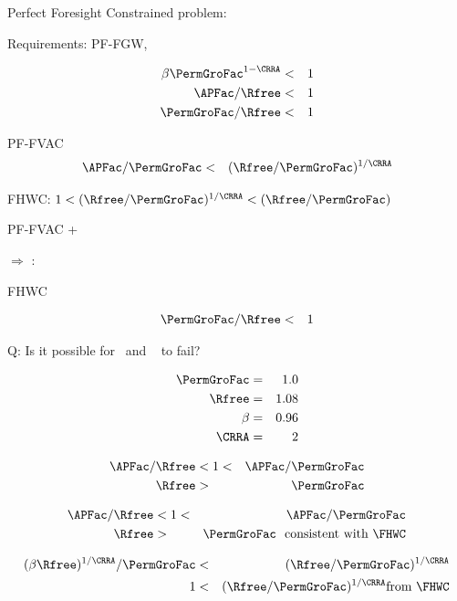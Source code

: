 \documentclass[titlepage,abstract]{bejournal}
\begin{document}
Perfect Foresight Constrained problem:

Requirements: PF-FGW, \FHWC~





\begin{eqnarray}
    \beta \PermGroFac^{1-\CRRA} & < & 1   \label{eq:PFFVAC}
\\  \APFac/\Rfree & < & 1 \label{eq:RIC}
\\  \PermGroFac/\Rfree & < & 1  \label{eq:FHWC}
\end{eqnarray}

PF-FVAC
\begin{eqnarray}
  \APFac/\PermGroFac & < & (\Rfree/\PermGroFac)^{1/\CRRA} \label{eq:RIC}
\end{eqnarray}

FHWC: $1 < (\Rfree/\PermGroFac)^{1/\CRRA} < (\Rfree/\PermGroFac)$

PF-FVAC + \FHWC~




$\Rightarrow$ \RIC:


FHWC~





\begin{eqnarray}
  \PermGroFac/\Rfree & < & 1  \label{eq:PFFVAC}
\end{eqnarray}


Q: Is it possible for \RIC~and \GICMod~
to fail?


\begin{eqnarray}
  \PermGroFac & = & 1.0
\\ \Rfree & = & 1.08
\\ \beta  & = & 0.96
\\ \CRRA & = & 2
\end{eqnarray}



\begin{eqnarray}
  \label{eq:GICModFails}
  \APFac/\Rfree & < 1  < & \APFac/\PermGroFac 
\\ \Rfree & > & \PermGroFac
\end{eqnarray}

\begin{eqnarray}
  \label{eq:GICModFails}
  \APFac/\Rfree & < 1  < & \APFac/\PermGroFac 
\\ \Rfree & > & \PermGroFac \text{~~consistent with \FHWC}
\end{eqnarray}

\begin{eqnarray}
  \label{eq:1}
  (\beta \Rfree)^{1/\CRRA}/\PermGroFac & < & (\Rfree/\PermGroFac)^{1/\CRRA} 
\\ 1 & < &  (\Rfree/\PermGroFac)^{1/\CRRA} \text{from \FHWC}
\end{eqnarray}
\end{document}

